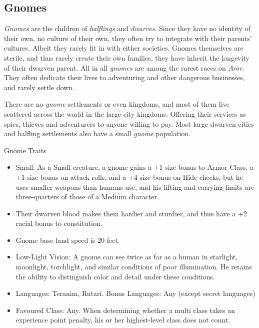 \subsection{Gnomes}
\label{sec:Gnomes}

\emph{Gnomes} are the children of \emph{halflings} and \emph{dwarves}. Since
they have no identity of their own, no culture of their own, they often try to
integrate with their parents' cultures. Albeit they rarely fit in with either
societies. Gnomes themselves are sterile, and thus rarely create their own
families, they have inherit the longevity of their dwarven parent. All in
all \emph{gnomes} are among the rarest races on \emph{Aror}. They often
dedicate their lives to adventuring and other dangerous businesses, and rarely
settle down.

There are no \emph{gnome} settlements or even kingdoms, and most of them live
scattered across the world in the large city kingdoms. Offering their services
as spies, thieves and adventurers to anyone willing to pay. Most large dwarven
cities and halfling settlements also have a small \emph{gnome} population.

\begin{35e}{Gnome Traits}
  \begin{itemize}[noitemsep]
    \item Small: As a Small creature, a gnome gains a +1 size bonus to Armor
    Class, a +1 size bonus on attack rolls, and a +4 size bonus on Hide
    checks, but he uses smaller weapons than humans use, and his lifting and
    carrying limits are three-quarters of those of a Medium character.
    \item Their dwarven blood makes them hardier and sturdier, and thus have
      a +2 racial bonus to constitution.
    \item Gnome base land speed is 20 feet.
    \item Low-Light Vision: A gnome can see twice as far as a human in
    starlight, moonlight, torchlight, and similar conditions of poor
    illumination. He retains the ability to distinguish color and detail under
    these conditions.
    \item Languages: Teranim, Rutari. Bonus Languages: Any (except secret
       languages)
    \item Favoured Class: Any. When determining whether a multi class takes an
    experience point penalty, his or her highest-level class does not count.
  \end{itemize}
\end{35e}
